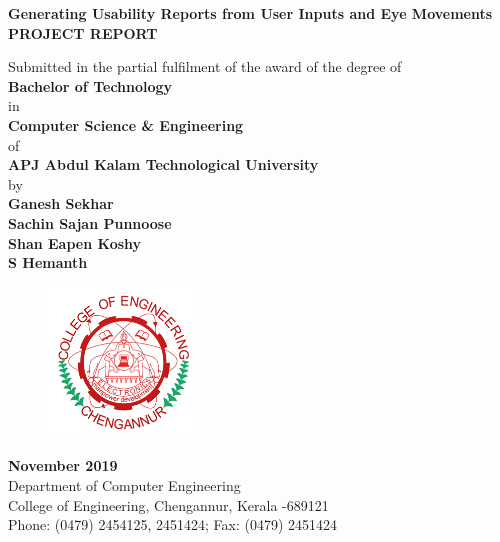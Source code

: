 \documentclass[a4paper,12pt,oneside]{article}
\begin{document}
\thispagestyle{empty}
\begin{center}

\large{\textbf{{Generating Usability Reports from User Inputs and Eye Movements}}}
\setlength{\baselineskip}{1.5\baselineskip}
\\
\vspace{5mm}
\textbf{PROJECT REPORT}

Submitted in the partial fulfilment of the award of the degree
of
\\
\textbf{Bachelor of Technology}
\\
in
\\
\textbf{Computer Science \& Engineering}
\\
of
\\
\textbf{APJ Abdul Kalam Technological University}
\\
by
\\
\textbf{Ganesh Sekhar}
\\
\textbf{Sachin Sajan Punnoose}
\\
\textbf{Shan Eapen Koshy}
\\
\textbf{S Hemanth}
\\
\vspace{5mm}
\begin{figure}[H]
\centering
\includegraphics[width=4cm]{ceclogo.png}
\end{figure}
\textbf{November 2019}
\vspace{8mm}
\\
Department of Computer Engineering
\\
College of Engineering, Chengannur, Kerala -689121
\\
Phone: (0479) 2454125, 2451424; Fax: (0479) 2451424
\\
\end{center}
\end{document}
